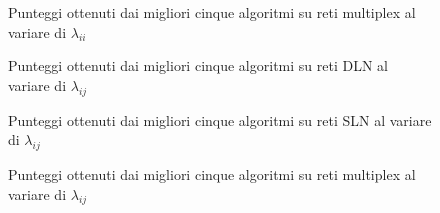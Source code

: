 \begin{figure}
    \centering
    \resizebox{\textwidth}{!}{}
    
    \caption{Punteggi ottenuti dai migliori cinque algoritmi su reti multiplex al variare di $\lambda_{ii}$}
    \label{chart:muxii}
\end{figure}




\begin{figure}
    
    \centering
    \resizebox{\textwidth}{!}{}
    
    \caption{Punteggi ottenuti dai migliori cinque algoritmi su reti DLN al variare di $\lambda_{ij}$}
    \label{chart:dlnij}
\end{figure}


\begin{figure}
    
    \centering
    \resizebox{\textwidth}{!}{}
    
    \caption{Punteggi ottenuti dai migliori cinque algoritmi su reti SLN al variare di $\lambda_{ij}$}
    \label{chart:slnij}
\end{figure}

\begin{figure}
    
    \centering
    \resizebox{\textwidth}{!}{}
    
    \caption{Punteggi ottenuti dai migliori cinque algoritmi su reti multiplex al variare di $\lambda_{ij}$}
    \label{chart:muxij}
\end{figure}